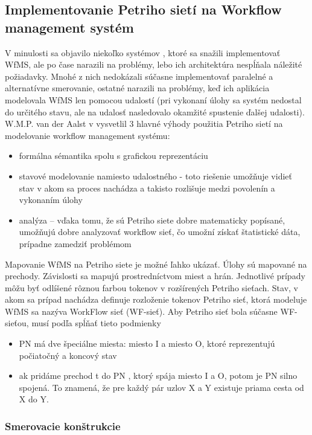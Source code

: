 \subsection{Implementovanie Petriho sietí na Workflow management systém}
\label{kap:teoria_petriho_siete_na_workflow}
V minulosti sa objavilo niekoľko systémov , ktoré sa snažili implementovať WfMS, ale po čase narazili na problémy, lebo ich architektúra nespĺňala náležité požiadavky. Mnohé z nich nedokázali súčasne implementovať paralelné a alternatívne smerovanie, ostatné narazili na problémy, keď ich aplikácia modelovala WfMS len pomocou udalostí (pri vykonaní úlohy sa systém nedostal do určitého stavu, ale na udalosť nasledovalo okamžité spustenie ďalšej udalosti).
W.M.P. van der Aalst v \cite{workflow_vyhody}
vysvetlil 3 hlavné výhody použitia Petriho sietí na modelovanie workflow management systému:
\begin{itemize}
	\item formálna sémantika spolu s grafickou reprezentáciu
	\item stavové modelovanie namiesto udalostného - toto riešenie umožňuje vidieť stav v akom sa proces nachádza a takisto rozlišuje medzi povolenín a vykonaním úlohy  %
	\item analýza – vďaka tomu, že sú Petriho siete dobre matematicky popísané, umožňujú dobre analyzovať workflow sieť, čo umožní získať štatistické dáta, prípadne zamedziť problémom
\end{itemize}

Mapovanie WfMS na Petriho siete je možné ľahko ukázať. Úlohy sú mapované na prechody. Závislosti sa mapujú prostredníctvom miest a hrán. Jednotlivé prípady môžu byť odlíšené rôznou farbou tokenov v rozšírených Petriho sieťach. Stav, v akom sa prípad nachádza definuje rozloženie tokenov
Petriho sieť, ktorá modeluje WfMS sa nazýva WorkFlow sieť (WF-sieť). Aby Petriho sieť bola súčasne WF-sieťou, musí podľa \cite{workflow_systemy} spĺňať tieto podmienky
\begin{itemize}
	\item PN má dve špeciálne miesta: miesto I a miesto O, ktoré reprezentujú počiatočný a koncový stav 
	\item  ak pridáme prechod t do PN , ktorý spája miesto I a O, potom je PN silno spojená. To znamená, že pre každý pár uzlov X a Y  existuje priama cesta od X do Y. 
\end{itemize}

\subsubsection{Smerovacie konštrukcie}

